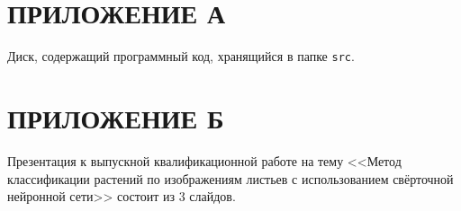 \chapter*{ПРИЛОЖЕНИЕ А}
{}
Диск, содержащий программный код, хранящийся в папке \texttt{src}.

\chapter*{ПРИЛОЖЕНИЕ Б}
{}
Презентация к выпускной квалификационной работе на тему <<Метод классификации растений по изображениям листьев с использованием свёрточной нейронной сети>> состоит из 3 слайдов.
